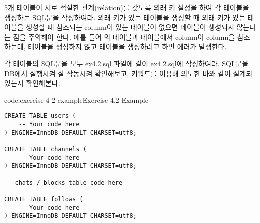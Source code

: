 5개 테이블이 서로 적절한 관계(relation)를 갖도록 외래 키 설정을 하여 각 테이블을 생성하는 SQL문을 작성하여라. 외래 키가 있는 테이블을 생성할 때 외래 키가 있는 테이블을 생성할 때 참조되는 column이 있는 테이블이 없으면 테이블이 생성되지 않는다는 점을 주의해야 한다. 예를 들어 의  테이블과  테이블에서  column이  column을 참조하는데,  테이블을 생성하지 않고  테이블을 생성하려고 하면 에러가 발생한다.

각 테이블의 SQL문을 모두 ex4.2.sql 파일에 \과 같이 ex4.2.sql에 작성하여라. SQL문을 DB에서 실행시켜 잘 작동시켜 확인해보고,  키워드를 이용해 의도한 바와 같이 설계되었는지 확인해본다.

\begin{codeenv}{code:exercise-4-2-example}{Exercise 4.2 Example}\begin{verbatim}
CREATE TABLE users (
    -- Your code here
) ENGINE=InnoDB DEFAULT CHARSET=utf8;

CREATE TABLE channels (
    -- Your code here
) ENGINE=InnoDB DEFAULT CHARSET=utf8;

-- chats / blocks table code here

CREATE TABLE follows (
    -- Your code here
) ENGINE=InnoDB DEFAULT CHARSET=utf8;
\end{verbatim}
\end{codeenv}
